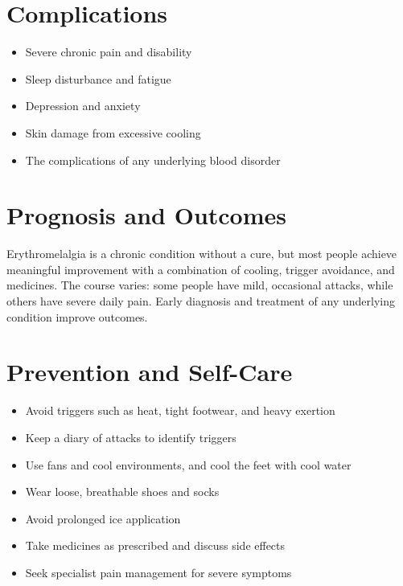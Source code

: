 \section*{Complications}
\begin{itemize}
    \item Severe chronic pain and disability
    \item Sleep disturbance and fatigue
    \item Depression and anxiety
    \item Skin damage from excessive cooling
    \item The complications of any underlying blood disorder
\end{itemize}

\section*{Prognosis and Outcomes}
Erythromelalgia is a chronic condition without a cure, but most people achieve meaningful improvement with a combination of cooling, trigger avoidance, and medicines. The course varies: some people have mild, occasional attacks, while others have severe daily pain. Early diagnosis and treatment of any underlying condition improve outcomes.

\section*{Prevention and Self-Care}
\begin{itemize}
    \item Avoid triggers such as heat, tight footwear, and heavy exertion
    \item Keep a diary of attacks to identify triggers
    \item Use fans and cool environments, and cool the feet with cool water
    \item Wear loose, breathable shoes and socks
    \item Avoid prolonged ice application
    \item Take medicines as prescribed and discuss side effects
    \item Seek specialist pain management for severe symptoms
\end{itemize}

